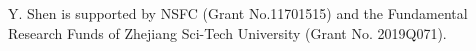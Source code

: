 \documentclass[a4paper,10pt]{amsart}
\theoremstyle{definition}
\numberwithin{equation}{section}
\begin{document}

%


 Y. Shen is supported by NSFC (Grant No.11701515) and the Fundamental Research Funds of Zhejiang Sci-Tech University (Grant No. 2019Q071).
\end{document}
